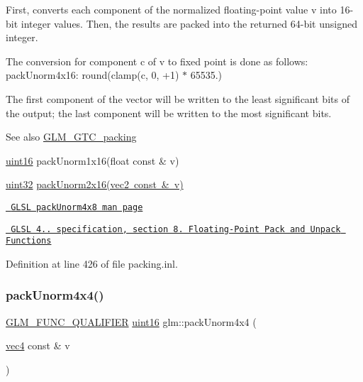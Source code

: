 First, converts each component of the normalized floating-\/point value v into 16-\/bit integer values. Then, the results are packed into the returned 64-\/bit unsigned integer.

The conversion for component c of v to fixed point is done as follows\+: pack\+Unorm4x16\+: round(clamp(c, 0, +1) $\ast$ 65535.)

The first component of the vector will be written to the least significant bits of the output; the last component will be written to the most significant bits.

\begin{DoxySeeAlso}{See also}
\mbox{\hyperlink{group__gtc__packing}{G\+L\+M\+\_\+\+G\+T\+C\+\_\+packing}} 

\mbox{\hyperlink{group__gtc__type__precision_gad8c2939e1fdd8e5828b31d95c52255d5}{uint16}} pack\+Unorm1x16(float const \& v) 

\mbox{\hyperlink{group__gtc__type__precision_ga202b6a53c105fcb7e531f9b443518451}{uint32}} \mbox{\hyperlink{group__core__func__packing_ga0659ddaf09727551c7bf51655d2a65cf}{pack\+Unorm2x16(vec2 const \& v)}} 

\href{http://www.opengl.org/sdk/docs/manglsl/xhtml/packUnorm4x8.xml}{\texttt{ G\+L\+SL pack\+Unorm4x8 man page}} 

\href{http://www.opengl.org/registry/doc/GLSLangSpec.4.20.8.pdf}{\texttt{ G\+L\+SL 4.. specification, section 8. Floating-\/\+Point Pack and Unpack Functions}} 
\end{DoxySeeAlso}


Definition at line 426 of file packing.\+inl.

\mbox{\label{group__gtc__packing_gad493c9f130e91dd8a4b360b05dcea573}} 
\subsubsection{\texorpdfstring{packUnorm4x4()}{packUnorm4x4()}}
{\footnotesize\ttfamily \mbox{\hyperlink{setup_8hpp_a33fdea6f91c5f834105f7415e2a64407}{G\+L\+M\+\_\+\+F\+U\+N\+C\+\_\+\+Q\+U\+A\+L\+I\+F\+I\+ER}} \mbox{\hyperlink{group__gtc__type__precision_gad8c2939e1fdd8e5828b31d95c52255d5}{uint16}} glm\+::pack\+Unorm4x4 (\begin{DoxyParamCaption}\item[{\mbox{\hyperlink{group__core__types_ga5881b1b022d7fd1b7218f5916532dd02}{vec4}} const \&}]{v }\end{DoxyParamCaption})}

